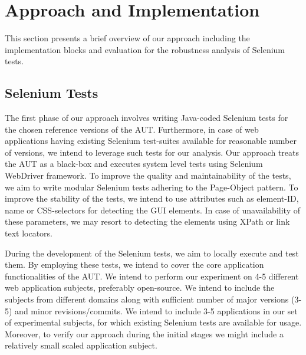 \chapter{Approach and Implementation} %

\label{Chapter5} %


This section presents a brief overview of our approach including the  implementation blocks and evaluation for the robustness analysis of Selenium tests.

\section{Selenium Tests}
\label{sec:WritingTests}
\vspace{-2mm} The first phase of our approach involves writing Java-coded Selenium tests for the chosen reference versions of the AUT. Furthermore, in case of web applications having existing Selenium test-suites available for reasonable number of versions, we intend to leverage such tests for our analysis. Our approach treats the AUT as a black-box and executes system level tests using Selenium WebDriver framework. To improve the quality and maintainability of the tests, we aim to write modular Selenium tests adhering to the Page-Object pattern. To improve the stability of the tests, we intend to use attributes such as element-ID, name or CSS-selectors for detecting the GUI elements. In case of unavailability of these parameters, we may resort to detecting the elements using XPath or link text locators. 

During the development of the Selenium tests, we aim to locally execute and test them.  By employing these tests, we intend to cover the core application functionalities of the AUT. We intend to perform our experiment on 4-5 different web application subjects, preferably open-source. We intend to include the subjects from different domains along with sufficient number of major versions (3-5) and minor revisions/commits. We intend to include 3-5 applications in our set of experimental subjects, for which existing Selenium tests are available for usage. Moreover, to verify our approach during the initial stages we might include a relatively small scaled application subject.

